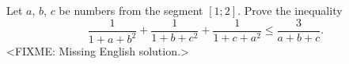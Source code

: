 \problem{}
Let $a$, $b$, $c$ be numbers from the segment $[1; 2]$.
Prove the inequality
\[
    \frac{1}{1 + a + b^2}
    +
    \frac{1}{1 + b + c^2}
    +
    \frac{1}{1 + c + a^2}
\leq
    \frac{3}{a + b + c}
.\]
\solution
<FIXME: Missing English solution.>
\endproblem
